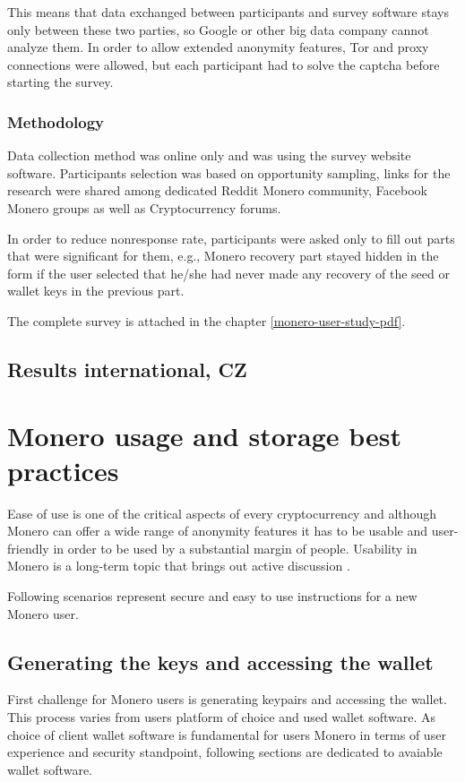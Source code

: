 \documentclass[
  printed, %
  table,   %
  nolof,     %
  nolot,     %
           oneside, color
]{fithesis3}
\begin{document}
This means that data exchanged between participants and survey software stays only between these two parties, so Google or other big data company cannot analyze them. In order to allow extended anonymity features, Tor and proxy connections were allowed, but each participant had to solve the captcha before starting the survey.
\subsection{Methodology}
Data collection method was online only and was using the survey website software. Participants selection was based on opportunity sampling, links for the research were shared among dedicated Reddit Monero community, Facebook Monero groups as well as Cryptocurrency forums.

In order to reduce nonresponse rate, participants were asked only to fill out parts that were significant for them, e.g., Monero recovery part stayed hidden in the form if the user selected that he/she had never made any recovery of the seed or wallet keys in the previous part. 

The complete survey is attached in the chapter \ref{monero-user-study-pdf}.


\section{Results international, CZ}

\chapter{Monero usage and storage best practices}
Ease of use is one of the critical aspects of every cryptocurrency and although Monero can offer a wide range of anonymity features it has to be usable and user-friendly in order to be used by a substantial margin of people. Usability in Monero is a long-term topic that brings out active discussion \cite{monerolang2018}.

Following scenarios represent secure and easy to use instructions for a new Monero user.

\section{Generating the keys and accessing the wallet}
First challenge for Monero users is generating keypairs and accessing the wallet. This process varies from users platform of choice and used wallet software. As choice of client wallet software is fundamental for users Monero in terms of user experience and security standpoint, following sections are dedicated to avaiable wallet software.
\end{document}
